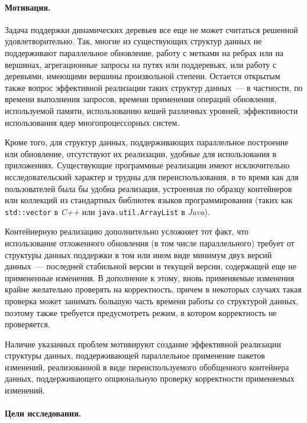 \documentclass[specification,annotation]{itmo-student-thesis}
\begin{document}
\paragraph{Мотивация.}

Задача поддержки динамических деревьев все еще не может считаться решенной удовлетворительно. Так, многие из существующих структур данных не поддерживают параллельное
обновление, работу с метками на ребрах или на вершинах, агрегационные запросы на путях или поддеревьях, или работу с деревьями, имеющими вершины произвольной степени.
Остается открытым также вопрос эффективной реализации таких структур данных~--- в частности, по времени выполнения запросов, времени применения операций обновления,
используемой памяти, использованию кешей различных уровней, эффективности использования ядер многопроцессорных систем.

Кроме того, для структур данных, поддерживающих параллельное построение или обновление, отсутствуют их реализации, удобные для использования в приложениях.
Существующие программные реализации имеют исключительно исследовательский характер и трудны для переиспользования, в то время как для пользователей
была бы удобна реализация, устроенная по образцу контейнеров или коллекций из стандартных библиотек языков программирования (таких как
\texttt{std::vector} в \emph{C++} или \texttt{java.util.ArrayList} в \emph{Java}).

Контейнерную реализацию дополнительно усложняет тот факт, что использование отложенного обновления (в том числе параллельного) требует от структуры данных
поддержки в том или ином виде минимум двух версий данных~--- последней стабильной версии и текущей версии, содержащей еще не примененные изменения.
В дополнение к этому, вновь применяемые изменения крайне желательно проверять на корректность, причем в некоторых случаях такая проверка может занимать большую часть
времени работы со структурой данных, поэтому также требуется предусмотреть режим, в котором корректность не проверяется.

Наличие указанных проблем мотивируют создание эффективной реализации структуры данных, поддерживающей параллельное применение пакетов изменений,
реализованной в виде переиспользуемого обобщенного контейнера данных, поддерживающего опциональную проверку корректности применяемых изменений.

\paragraph{Цели исследования.}
\end{document}
